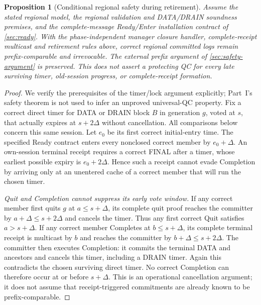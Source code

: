 \documentclass[11pt,a4paper]{article}
\newtheorem{proposition}[proposition]{Proposition}
\begin{document}
\begin{proposition}[Conditional regional safety during retirement]
\label{prop:retirement-safety}
Assume the stated regional model, the regional validation
and DATA/DRAIN soundness premises, and the complete-message Ready/Enter
installation contract of \cref{sec:ready}. With the phase-independent manager closure handler,
complete-receipt multicast and retirement rules above, correct regional committed logs
remain prefix-comparable and irrevocable. The external prefix argument
of \cref{sec:safety-argument} is preserved. This does not assert a
protecting QC for every late surviving timer, old-session progress,
or complete-receipt formation.
\end{proposition}
\begin{proof}
We verify the prerequisites of the timer/lock argument explicitly;
Part~I's safety theorem is not used to infer an unproved universal-QC property.
Fix a correct direct timer for DATA or DRAIN block $B$ in generation
$g$, voted at $s$, that actually expires at $s+2\Delta$ without
cancellation. All comparisons below concern this same session.
Let $e_0$ be its first correct initial-entry time. The specified Ready
contract enters every nonclosed correct member by $e_0+\Delta$.
An own-session terminal receipt requires a correct FINAL after a timer,
whose earliest possible expiry is $e_0+2\Delta$. Hence such a receipt
cannot evade Completion by arriving only at an unentered cache of a
correct member that will run the chosen timer.

\emph{Quit and Completion cannot suppress its early vote window.}
If any correct member first quits $g$ at $a\le s+\Delta$, its complete
quit proof reaches the committer by $a+\Delta\le s+2\Delta$ and
cancels the timer. Thus any first correct Quit satisfies
$a>s+\Delta$. If any correct member Completes at $b\le s+\Delta$,
its complete terminal receipt is multicast by $b$ and reaches the
committer by $b+\Delta\le s+2\Delta$. The committer then executes
Completion: it commits the terminal DATA and ancestors and cancels
this timer, including a DRAIN timer. Again this contradicts the chosen
surviving direct timer. No correct Completion can therefore occur at
or before $s+\Delta$. This is an operational cancellation argument;
it does not assume that receipt-triggered commitments are already
known to be prefix-comparable.


\end{proof}
\end{document}
